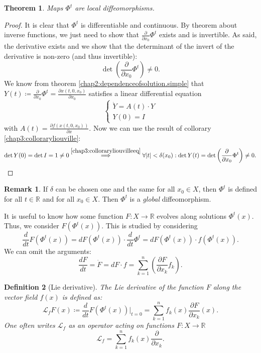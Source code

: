 \documentclass[hidelinks,a4paper, 11pt]{article}
\theoremstyle{plain}
\newtheorem{theorem}{Theorem}
\theoremstyle{break}
\theoremstyle{plain}
\newtheorem{definition}[theorem]{Definition}
\theoremstyle{definition}
\newtheorem*{remark}{Remark}
\begin{document}
\begin{theorem}
	Maps $\Phi^t$ are local diffeomorphisms.
\end{theorem}
\begin{proof}
It is clear that $\Phi^t$ is differentiable and continuous. By theorem about inverse functions, we just need to show that $\frac{\partial}{\partial x_0}\Phi^t$ exists and is invertible. As said, the derivative exists and we show that the determinant of the invert of the derivative is non-zero (and thus invertible):
\[
	\det \left( \frac{\partial }{\partial x_0}\Phi^t \right)  \neq 0.
\]
We know from theorem \eqref{chap2:dependenceofsolution.simple} that $Y(t) \coloneqq \frac{\partial}{\partial x_0}\Phi^t = \frac{\partial x(t,0,x_0)}{\partial x_0}$ satisfies a linear differential equation $$\begin{cases}\dot  Y = A(t) \cdot Y\\ Y(0) = I\end{cases}$$ with $A(t) = \frac{\partial f(x(t,0,x_0))}{\partial x}$. Now we can use the result of collorary \eqref{chap3:colloraryliouville}:
\[
	\det Y(0) = \det I = 1 \neq 0 \overset{\eqref{chap3:colloraryliouvilleeq}}{\implies} \forall |t| < \delta(x_0): \det Y(t) = \det \left( \frac{\partial }{\partial x_0}\Phi^t \right) \neq 0.
\]
\end{proof}

\begin{remark}
	If $\delta$ can be chosen one and the same for all $x_0 \in X$, then $\Phi^t$ is defined for all $t \in \mathbb R$ and for all $x_0 \in X$. Then $\Phi^t$ is a \emph{global} diffeomorphism.
\end{remark}

It is useful to know how some function $F: X \to \mathbb R$ evolves along solutions $\Phi^t(x)$. Thus, we consider $F(\Phi^t(x))$. This is studied by considering
\[
	\frac{d}{dt} F(\Phi^t(x)) = dF(\Phi^t(x)) \cdot \frac{d}{dt}\Phi^t = dF(\Phi^t(x)) \cdot f(\Phi^t(x)).
\]
We can omit the arguments:
\[
	\frac{dF}{dt} = \dot F = dF \cdot f = \sum^n_{k=1} \left(\frac{\partial F}{\partial x_k} f_k \right).
\]
\begin{definition}[Lie derivative] \label{chap3:liederivativedefinition}
	The \emph{Lie derivative} of the function $F$ along the vector field $f(x)$ is defined as:
	\[
	\mathcal L_fF(x) \coloneqq \frac{d}{dt} F(\Phi^t(x)) \Bigg \vert_{t=0} = \sum^n_{k=1}f_k(x)\frac{\partial F}{\partial x_k}(x).
	\]
	One often writes $\mathcal L_f$ as an operator acting on functions $F: X \to \mathbb R$
	\[
	\mathcal L_f = \sum^n_{k=1} f_k(x) \frac{\partial}{\partial x_k}.
	\]
\end{definition}
\end{document}
